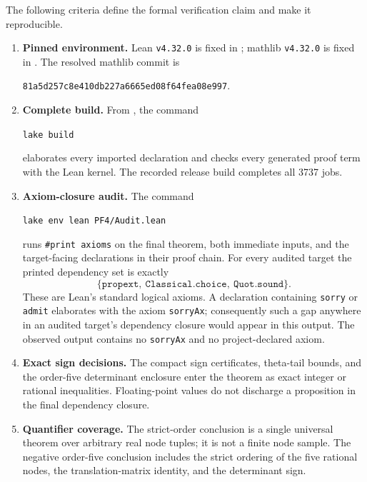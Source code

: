 The following criteria define the formal verification claim and make it
reproducible.
\begin{enumerate}
\item \textbf{Pinned environment.} Lean \texttt{v4.32.0} is fixed in
; mathlib \texttt{v4.32.0} is fixed in
. The resolved mathlib commit is
\begin{center}
{\footnotesize\texttt{81a5d257c8e410db227a6665ed08f64fea08e997}}.
\end{center}

\item \textbf{Complete build.} From , the command
\begin{center}
\texttt{lake build}
\end{center}
elaborates every imported declaration and checks every generated proof term
with the Lean kernel. The recorded release build completes all 3737 jobs.

\item \textbf{Axiom-closure audit.} The command
\begin{center}
\texttt{lake env lean PF4/Audit.lean}
\end{center}
runs \texttt{\#print axioms} on the final theorem, both immediate inputs, and
the target-facing declarations in their proof chain. For every audited target
the printed dependency set is exactly
\[
 \{\texttt{propext},\ \texttt{Classical.choice},\ \texttt{Quot.sound}\}.
\]
These are Lean's standard logical axioms. A declaration containing
\texttt{sorry} or \texttt{admit} elaborates with the axiom
\texttt{sorryAx}; consequently such a gap anywhere in an audited target's
dependency closure would appear in this output. The observed output contains
no \texttt{sorryAx} and no project-declared axiom.

\item \textbf{Exact sign decisions.} The compact sign certificates, theta-tail
bounds, and the order-five determinant enclosure enter the theorem as exact
integer or rational inequalities. Floating-point values do not discharge a
proposition in the final dependency closure.

\item \textbf{Quantifier coverage.} The strict-order conclusion is a single
universal theorem over arbitrary real node tuples; it is not a finite node
sample. The negative order-five conclusion includes the strict ordering of
the five rational nodes, the translation-matrix identity, and the determinant
sign.
\end{enumerate}

